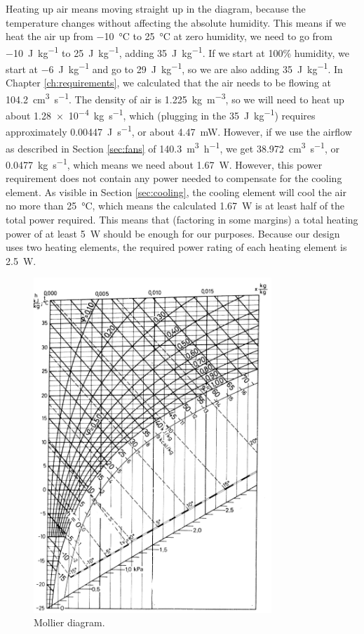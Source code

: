\documentclass[a4paper,oneside]{book}
\begin{document}
Heating up air means moving straight up in the diagram, because the temperature
changes without affecting the absolute humidity. This means if we heat the air
up from \SI{-10}{\celsius} to \SI{25}{\celsius} at zero humidity, we need to go
from \SI{-10}{\J\per\kg} to \SI{25}{\J\per\kg}, adding \SI{35}{\J\per\kg}. If
we start at 100\% humidity, we start at \SI{-6}{\J\per\kg} and go to
\SI{29}{\J\per\kg}, so we are also adding \SI{35}{\J\per\kg}. In Chapter
\ref{ch:requirements}, we calculated that the air needs to be flowing at
\SI{104.2}{\cm\cubed\per\s}. The density of air is \SI{1.225}{\kg\per\m\cubed},
so we will need to heat up about \SI{1.28e-4}{\kg\per\s}, which (plugging in
the \SI{35}{\J\per\kg}) requires approximately \SI{0.00447}{\J\per\s}, or about
\SI{4.47}{\milli\W}. However, if we use the airflow as described in Section
\ref{sec:fans} of \SI{140.3}{\m\cubed\per\hour}, we get
\SI{38,972}{\cm\cubed\per\s}, or \SI{0.0477}{\kg\per\s}, which means we need
about \SI{1.67}{\W}. However, this power requirement does not contain any power
needed to compensate for the cooling element. As visible in Section
\ref{sec:cooling}, the cooling element will cool the air no more than
\SI{25}{\celsius}, which means the calculated \SI{1.67}{\W} is at least half of
the total power required. This means that (factoring in some margins) a total
heating power of at least \SI{5}{\W} should be enough for our purposes. Because
our design uses two heating elements, the required power rating of each heating
element is \SI{2.5}{\W}.

\begin{figure}[h]
\centering
\includegraphics[width=0.8\textwidth]{images/mollier.png}
\caption{Mollier diagram. \protect\cite{mollier}}
\label{fig:mollier}
\end{figure}
\end{document}
